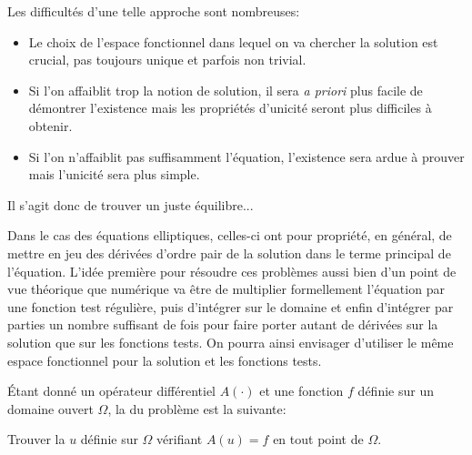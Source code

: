 \medskip



Les difficultés d'une telle approche sont nombreuses:
\begin{itemize}
   \item Le choix de l'espace fonctionnel dans lequel on va chercher la solution est crucial,
	pas toujours unique et parfois non trivial.
   \item Si l'on affaiblit trop la notion de solution, il sera \emph{a priori} plus facile de démontrer l'existence
	mais les propriétés d'unicité seront plus difficiles à obtenir.
   \item Si l'on n'affaiblit pas suffisamment l'équation, l'existence sera ardue à prouver mais
	l'unicité sera plus simple.
\end{itemize}


\medskip



Il s'agit donc de trouver un juste équilibre...

Dans le cas des équations elliptiques, celles-ci ont pour propriété, en général, de mettre en jeu
des dérivées d'ordre pair de la solution dans le terme principal de l'équation.
L'idée première pour résoudre ces problèmes aussi bien d'un point de vue théorique
que numérique va être de multiplier formellement l'équation par une fonction test régulière,
puis d'intégrer sur le domaine et enfin d'intégrer par parties un nombre suffisant de fois pour
faire porter autant de dérivées sur la solution que sur les fonctions tests.
On pourra ainsi envisager d'utiliser le même espace fonctionnel pour la solution et les
fonctions tests.






\bigskip


%
%
Étant donné un opérateur différentiel $A(\cdot)$ et une fonction $f$ définie sur un domaine
ouvert $\Omega$, la  du problème est la suivante:
\begin{center}
    Trouver la  $u$ définie sur $\Omega$ vérifiant $A(u)=f$ en tout point de $\Omega$.
\end{center}

